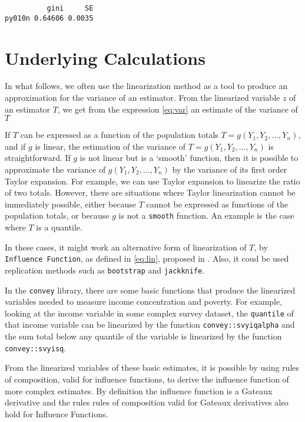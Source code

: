 \documentclass[]{book}
\begin{document}
\begin{verbatim}
          gini     SE
py010n 0.64606 0.0035
\end{verbatim}

\section{Underlying Calculations}\label{underlying-calculations}

In what follows, we often use the linearization method as a tool to
produce an approximation for the variance of an estimator. From the
linearized variable \(z\) of an estimator \(T\), we get from the
expression \eqref{eq:var} an estimate of the variance of \(T\)

If \(T\) can be expressed as a function of the population totals
\(T = g(Y_1, Y_2, \ldots, Y_n)\), and if \(g\) is linear, the estimation
of the variance of \(T = g(Y_1, Y_2, \ldots, Y_n)\) is straightforward.
If \(g\) is not linear but is a `smooth' function, then it is possible
to approximate the variance of \(g(Y_1, Y_2, \ldots, Y_n)\) by the
variance of its first order Taylor expansion. For example, we can use
Taylor expansion to linearize the ratio of two totals. However, there
are situations where Taylor linearization cannot be immediately
possible, either because \(T\) cannot be expressed as functions of the
population totals, or because \(g\) is not a \texttt{smooth} function.
An example is the case where \(T\) is a quantile.

In these cases, it might work an alternative form of linearization of
\(T\), by \texttt{Influence\ Function}, as defined in \eqref{eq:lin},
proposed in \citep{deville1999}. Also, it coud be used replication
methods such as \texttt{bootstrap} and \texttt{jackknife}.

In the \texttt{convey} library, there are some basic functions that
produce the linearized variables needed to measure income concentration
and poverty. For example, looking at the income variable in some complex
survey dataset, the \texttt{quantile} of that income variable can be
linearized by the function \texttt{convey::svyiqalpha} and the sum total
below any quantile of the variable is linearized by the function
\texttt{convey::svyisq}.

From the linearized variables of these basic estimates, it is possible
by using rules of composition, valid for influence functions, to derive
the influence function of more complex estimates. By definition the
influence function is a Gateaux derivative and the rules rules of
composition valid for Gateaux derivatives also hold for Influence
Functions.
\end{document}
